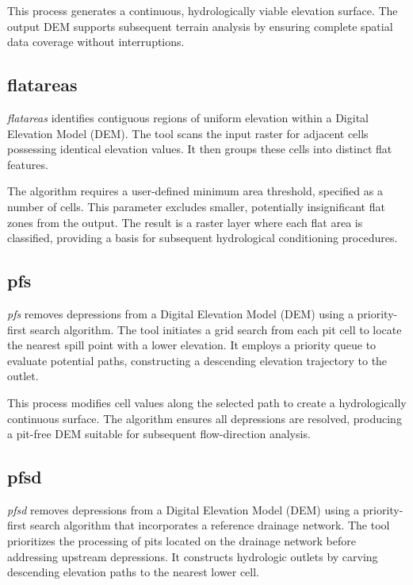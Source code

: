 \documentclass[
]{book}
\theoremstyle{definition}
\theoremstyle{definition}
\theoremstyle{definition}
\theoremstyle{definition}
\theoremstyle{remark}
\begin{document}
This process generates a continuous, hydrologically viable elevation surface. The output DEM supports subsequent terrain analysis by ensuring complete spatial data coverage without interruptions.

\subsection{flatareas}\label{flatareas}

\emph{flatareas} identifies contiguous regions of uniform elevation within a Digital Elevation Model (DEM). The tool scans the input raster for adjacent cells possessing identical elevation values. It then groups these cells into distinct flat features.

The algorithm requires a user-defined minimum area threshold, specified as a number of cells. This parameter excludes smaller, potentially insignificant flat zones from the output. The result is a raster layer where each flat area is classified, providing a basis for subsequent hydrological conditioning procedures.

\subsection{pfs}\label{pfs}

\emph{pfs} removes depressions from a Digital Elevation Model (DEM) using a priority-first search algorithm. The tool initiates a grid search from each pit cell to locate the nearest spill point with a lower elevation. It employs a priority queue to evaluate potential paths, constructing a descending elevation trajectory to the outlet.

This process modifies cell values along the selected path to create a hydrologically continuous surface. The algorithm ensures all depressions are resolved, producing a pit-free DEM suitable for subsequent flow-direction analysis.

\subsection{pfsd}\label{pfsd}

\emph{pfsd} removes depressions from a Digital Elevation Model (DEM) using a priority-first search algorithm that incorporates a reference drainage network. The tool prioritizes the processing of pits located on the drainage network before addressing upstream depressions. It constructs hydrologic outlets by carving descending elevation paths to the nearest lower cell.
\end{document}
